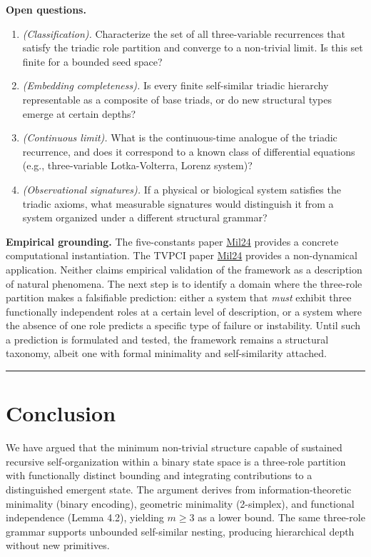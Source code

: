 \documentclass[12pt]{article}
\providecommand{\tightlist}{%
  \setlength{\itemsep}{0pt}\setlength{\parskip}{0pt}}
\begin{document}
\textbf{Open questions.}

\begin{enumerate}
\def\labelenumi{\arabic{enumi}.}
\tightlist
\item
  \emph{(Classification).} Characterize the set of all three-variable
  recurrences that satisfy the triadic role partition and converge to a
  non-trivial limit. Is this set finite for a bounded seed space?
\item
  \emph{(Embedding completeness).} Is every finite self-similar triadic
  hierarchy representable as a composite of base triads, or do new
  structural types emerge at certain depths?
\item
  \emph{(Continuous limit).} What is the continuous-time analogue of the
  triadic recurrence, and does it correspond to a known class of
  differential equations (e.g., three-variable Lotka-Volterra, Lorenz
  system)?
\item
  \emph{(Observational signatures).} If a physical or biological system
  satisfies the triadic axioms, what measurable signatures would
  distinguish it from a system organized under a different structural
  grammar?
\end{enumerate}

\textbf{Empirical grounding.} The five-constants paper
\href{https://tholonia.github.io/the-book/}{Mil24} provides a concrete
computational instantiation. The TVPCI paper
\href{https://tholonia.github.io/the-book/}{Mil24} provides a
non-dynamical application. Neither claims empirical validation of the
framework as a description of natural phenomena. The next step is to
identify a domain where the three-role partition makes a falsifiable
prediction: either a system that \emph{must} exhibit three functionally
independent roles at a certain level of description, or a system where
the absence of one role predicts a specific type of failure or
instability. Until such a prediction is formulated and tested, the
framework remains a structural taxonomy, albeit one with formal
minimality and self-similarity attached.

\begin{center}\rule{0.5\linewidth}{0.5pt}\end{center}

\section{Conclusion}\label{conclusion}

We have argued that the minimum non-trivial structure capable of
sustained recursive self-organization within a binary state space is a
three-role partition with functionally distinct bounding and integrating
contributions to a distinguished emergent state. The argument derives
from information-theoretic minimality (binary encoding), geometric
minimality (2-simplex), and functional independence (Lemma 4.2),
yielding \(m \ge 3\) as a lower bound. The same three-role grammar
supports unbounded self-similar nesting, producing hierarchical depth
without new primitives.
\end{document}
